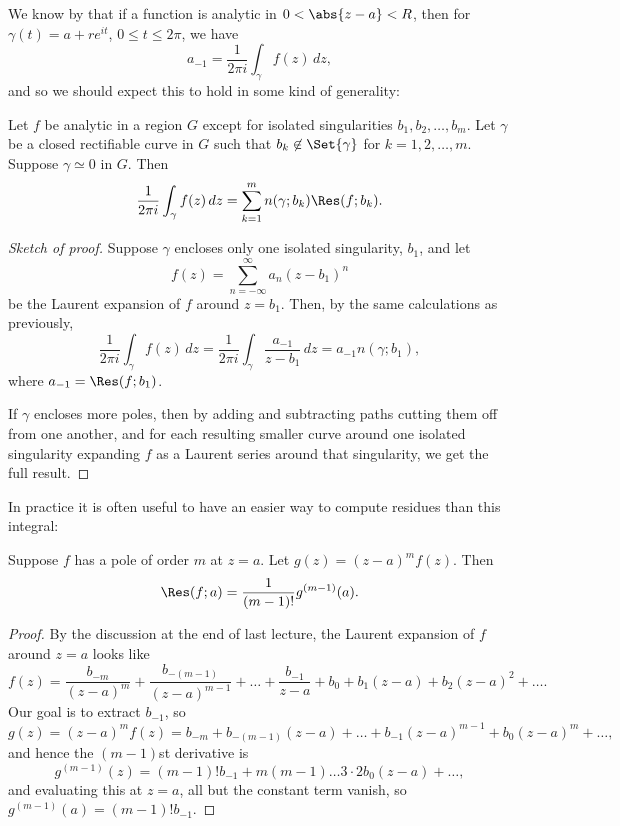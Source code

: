 We know by  that if a function is analytic in $0 < \abs{z - a} < R$, then for $\gamma(t) = a + r e^{i t}$, $0 \leq t \leq 2 \pi$, we have
\[
	a_{-1} = \frac{1}{2 \pi i} \int_\gamma f(z) \, d z,
\]
and so we should expect this to hold in some kind of generality:

\begin{theorem}\label{thm5.5}
	Let $f$ be analytic in a region $G$ except for isolated singularities $b_1, b_2, \dots, b_m$.
	Let $\gamma$ be a closed rectifiable curve in $G$ such that $b_k \not\in \Set{\gamma}$ for $k = 1, 2, \dots, m$.
	Suppose $\gamma \simeq 0$ in $G$.
	Then
	\[
		\frac{1}{2 \pi i} \int_\gamma f(z) \, d z = \sum_{k = 1}^m n(\gamma; b_k) \Res(f; b_k).
	\]
\end{theorem}

\begin{proof}[Sketch of proof]
	Suppose $\gamma$ encloses only one isolated singularity, $b_1$, and let
	\[
		f(z) = \sum_{n = -\infty}^\infty a_n (z - b_1)^n
	\]
	be the Laurent expansion of $f$ around $z = b_1$.
	Then, by the same calculations as previously,
	\[
		\frac{1}{2 \pi i} \int_\gamma f(z) \, d z = \frac{1}{2 \pi i} \int_\gamma \frac{a_{-1}}{z - b_1} \, d z = a_{-1} n(\gamma; b_1),
	\]
	where $a_{-1} = \Res(f; b_1)$.

	If $\gamma$ encloses more poles, then by adding and subtracting paths cutting them off from one another, and for each resulting smaller curve around one isolated singularity expanding $f$ as a Laurent series around that singularity, we get the full result.
\end{proof}

In practice it is often useful to have an easier way to compute residues than this integral:

\begin{proposition}\label{prop5.5}
	Suppose $f$ has a pole of order $m$ at $z = a$.
	Let $g(z) = (z - a)^m f(z)$.
	Then
	\[
		\Res(f; a) = \frac{1}{(m - 1)!} g^{(m - 1)}(a).
	\]
\end{proposition}

\begin{proof}
	By the discussion at the end of last lecture, the Laurent expansion of $f$ around $z = a$ looks like
	\[
		f(z) = \frac{b_{-m}}{(z - a)^m} + \frac{b_{-(m - 1)}}{(z - a)^{m - 1}} + \dots + \frac{b_{-1}}{z - a} + b_0 + b_1 (z - a) + b_2 (z - a)^2 + \dots.
	\]
	Our goal is to extract $b_{-1}$, so
	\[
		g(z) = (z - a)^m f(z) = b_{-m} + b_{-(m - 1)} (z - a) + \dots + b_{-1} (z - a)^{m - 1} + b_0 (z - a)^m + \dots,
	\]
	and hence the $(m - 1)$st derivative is
	\[
		g^{(m - 1)}(z) = (m - 1)! b_{-1} + m(m - 1) \dots 3 \cdot 2 b_0 (z - a) + \dots,
	\]
	and evaluating this at $z = a$, all but the constant term vanish, so $g^{(m - 1)}(a) = (m - 1)! b_{-1}$.
\end{proof}
